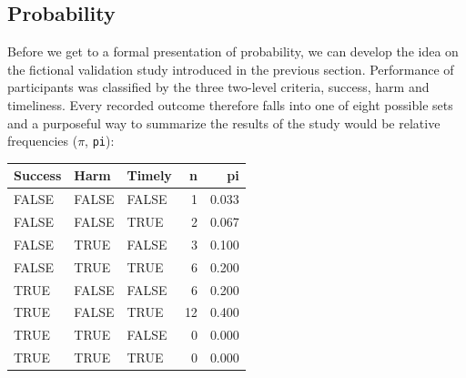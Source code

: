 \documentclass[]{svmono}
\newenvironment{Shaded}{\begin{snugshade}}{\end{snugshade}}
\newcommand{\KeywordTok}[1]{\textcolor[rgb]{0.13,0.29,0.53}{\textbf{#1}}}
\newcommand{\DataTypeTok}[1]{\textcolor[rgb]{0.13,0.29,0.53}{#1}}
\newcommand{\DecValTok}[1]{\textcolor[rgb]{0.00,0.00,0.81}{#1}}
\newcommand{\StringTok}[1]{\textcolor[rgb]{0.31,0.60,0.02}{#1}}
\newcommand{\CommentTok}[1]{\textcolor[rgb]{0.56,0.35,0.01}{\textit{#1}}}
\newcommand{\OperatorTok}[1]{\textcolor[rgb]{0.81,0.36,0.00}{\textbf{#1}}}
\newcommand{\NormalTok}[1]{#1}
\begin{document}
\subsection{Probability}\label{probability}

Before we get to a formal presentation of probability, we can develop
the idea on the fictional validation study introduced in the previous
section. Performance of participants was classified by the three
two-level criteria, success, harm and timeliness. Every recorded outcome
therefore falls into one of eight possible sets and a purposeful way to
summarize the results of the study would be relative frequencies
(\(\pi\), \texttt{pi}):

\begin{Shaded}
\end{Shaded}

\begin{tabular}{l|l|l|r|r}
\hline
Success & Harm & Timely & n & pi\\
\hline
FALSE & FALSE & FALSE & 1 & 0.033\\
\hline
FALSE & FALSE & TRUE & 2 & 0.067\\
\hline
FALSE & TRUE & FALSE & 3 & 0.100\\
\hline
FALSE & TRUE & TRUE & 6 & 0.200\\
\hline
TRUE & FALSE & FALSE & 6 & 0.200\\
\hline
TRUE & FALSE & TRUE & 12 & 0.400\\
\hline
TRUE & TRUE & FALSE & 0 & 0.000\\
\hline
TRUE & TRUE & TRUE & 0 & 0.000\\
\hline
\end{tabular}
\end{document}
